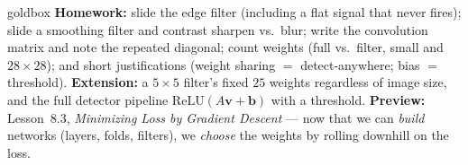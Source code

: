 \documentclass[10pt]{article}
\newcommand{\vv}{\mathbf{v}}
\newcommand{\bb}{\mathbf{b}}
\newcommand{\relu}{\mathrm{ReLU}}
\begin{document}
\begin{skillbox}{goldbox}
\textbf{Homework:} slide the edge filter (including a flat signal that never fires); slide a smoothing filter
and contrast sharpen vs.\ blur; write the convolution matrix and note the repeated diagonal; count weights
(full vs.\ filter, small and $28\times28$); and short justifications (weight sharing $=$ detect-anywhere; bias
$=$ threshold). \textbf{Extension:} a $5\times5$ filter's fixed $25$ weights regardless of image size, and the
full detector pipeline $\relu(A\vv+\bb)$ with a threshold. \textbf{Preview:} Lesson~8.3, \emph{Minimizing Loss
by Gradient Descent} --- now that we can \emph{build} networks (layers, folds, filters), we \emph{choose} the
weights by rolling downhill on the loss.
\end{skillbox}
\end{document}
